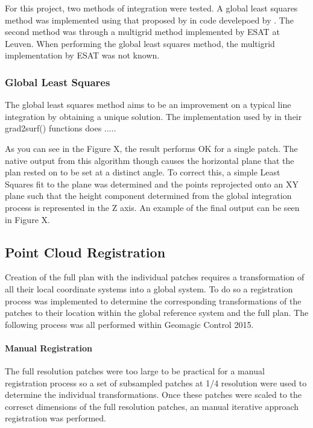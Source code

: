 	For this project, two methods of integration were tested. A global least squares method was implemented using that proposed by 
	 in code develepoed by 
	 . The second method was through a multigrid method implemented by ESAT at Leuven. When performing the global least squares method, the multigrid implementation by ESAT was not known.
	
	\subsubsection{Global Least Squares}
	The global least squares method aims to be an improvement on a typical line integration by obtaining a unique solution. The implementation used by 
	in their grad2surf() functions does .....
	
	As you can see in the Figure X, the result performs OK for a single patch. The native output from this algorithm though causes the horizontal plane that the plan rested on to be set at a distinct angle. To correct this, a simple Least Squares fit to the plane was determined and the points reprojected onto an XY plane such that the height component determined from the global integration process is represented in the Z axis. An example of the final output can be seen in Figure X.
				
	\subsection{Point Cloud Registration}
	Creation of the full plan with the individual patches requires a transformation of all their local coordinate systems into a global system. To do so a registration process was implemented to determine the corresponding transformations of the patches to their location within the global reference system and the full plan. The following process was all performed within Geomagic Control 2015.
	
		\paragraph{Manual Registration}
		The full resolution patches were too large to be practical for a manual registration process so a set of subsampled patches at 1/4 resolution were used to determine the individual transformations. Once these patches were scaled to the corresct dimensions of the full resolution patches, an manual iterative approach registration was performed. 
		
